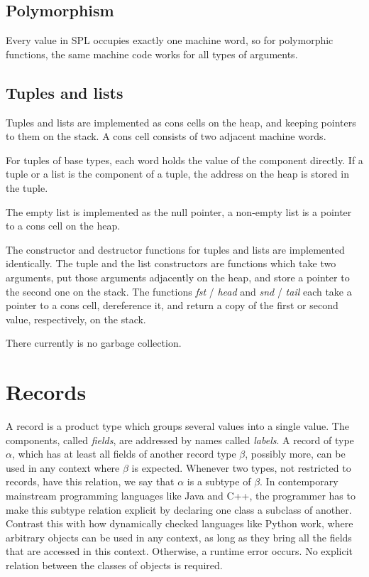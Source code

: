 \documentclass[a4paper]{article}
\begin{document}
\subsection{Polymorphism}

Every value in SPL occupies exactly one machine word, so for polymorphic
functions, the same machine code works for all types of arguments.

\subsection{Tuples and lists}

Tuples and lists are implemented as cons cells on the heap, and keeping
pointers to them on the stack.  A cons cell consists of two adjacent machine
words.

For tuples of base types, each word holds the value of the component directly.
If a tuple or a list is the component of a tuple, the address on the heap is
stored in the tuple.

The empty list is implemented as the null pointer, a non-empty list is a pointer
to a cons cell on the heap.

The constructor and destructor functions for tuples and lists are implemented
identically.  The tuple and the list constructors are functions which take two
arguments, put those arguments adjacently on the heap, and store a pointer to
the second one on the stack.  The functions \emph{fst} / \emph{head} and
\emph{snd} / \emph{tail} each take a pointer to a cons cell, dereference it, and
return a copy of the first or second value, respectively, on the stack.

There currently is no garbage collection.


\section{Records}

\label{sec_records}

A record is a product type which groups several values into a single value.  The
components, called \emph{fields}, are addressed by names called \emph{labels}.
A record of type $\alpha$, which has at least all fields of another record type
$\beta$, possibly more, can be used in any context where $\beta$ is expected.
Whenever two types, not restricted to records, have this relation, we say that
$\alpha$ is a subtype of $\beta$.  In contemporary mainstream programming
languages like Java and C++, the programmer has to make this subtype relation
explicit by declaring one class a subclass of another.  Contrast this with how
dynamically checked languages like Python work, where arbitrary objects can be
used in any context, as long as they bring all the fields that are accessed in
this context.  Otherwise, a runtime error occurs.  No explicit relation between
the classes of objects is required.
\end{document}
